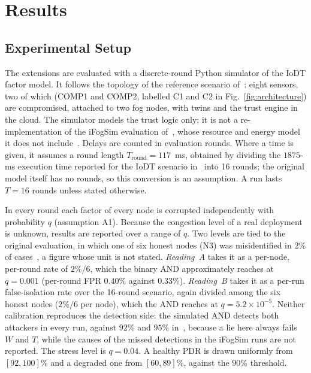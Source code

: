 \section{Results}
\label{sec:resultsAndDiscussion}

\subsection{Experimental Setup}
\label{sec:setup}
The extensions are evaluated with a discrete-round Python simulator of
the IoDT factor model.  It follows the topology of the reference
scenario of~\cite{soula2024iodt}: eight sensors, two of which
(COMP1 and COMP2, labelled C1 and C2 in Fig.~\ref{fig:architecture}) are compromised, attached to two fog nodes, with
twins and the trust engine in the cloud.  The simulator models the
trust logic only; it is not a re-implementation of the iFogSim
evaluation of~\cite{soula2024iodt}, whose resource and energy model it
does not include~\cite{gupta2017ifogsim}.  Delays are counted in
evaluation rounds.  Where a time is given, it assumes a round length
$T_{\mathrm{round}}=117$~ms, obtained by dividing the $1875$-ms
execution time reported for the IoDT scenario in~\cite{soula2024iodt}
into 16 rounds; the
original model itself has no rounds, so this conversion is an
assumption.  A run lasts $T=16$ rounds unless stated otherwise.

In every round each factor of every node is corrupted independently
with probability $q$ (assumption A1).  Because the congestion level of
a real deployment is unknown, results are reported over a range of
$q$.  Two levels are tied to the original evaluation, in which one of
six honest nodes (N3) was misidentified in $2\%$ of
cases~\cite{soula2024iodt}, a figure whose unit is not stated.
\emph{Reading~A} takes it as a per-node, per-round rate of $2\%/6$,
which the binary AND approximately reaches at $q=0.001$ (per-round
FPR $0.40\%$ against $0.33\%$).  \emph{Reading~B} takes it as a
per-run false-isolation rate over the 16-round scenario, again
divided among the six honest nodes ($2\%/6$ per node), which the AND
reaches at $q=5.2\times10^{-5}$.  Neither calibration
reproduces the detection side: the simulated AND detects both attackers
in every run, against $92\%$ and $95\%$ in~\cite{soula2024iodt},
because a lie here always fails $W$ and $T$, while the causes of the
missed detections in the iFogSim runs are not reported.  The stress
level is $q=0.04$.  A healthy PDR is drawn uniformly from $[92,100]\%$
and a degraded one from $[60,89]\%$, against the $90\%$ threshold.

